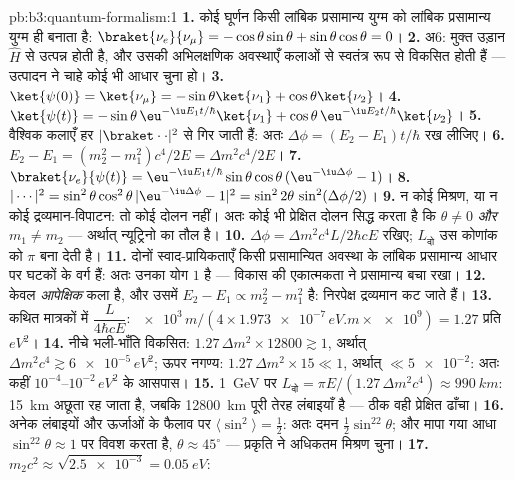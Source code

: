 \begin{solution}{pb:b3:quantum-formalism:1}
\textbf{1.} कोई घूर्णन किसी लांबिक प्रसामान्य युग्म को लांबिक
प्रसामान्य युग्म ही बनाता है: $\braket{\nu_e}{\nu_\mu} = -\cos\theta\sin\theta +
\sin\theta\cos\theta = 0$।
\textbf{2.} अ6: मुक्त उड़ान $\hat H$ से उत्पन्न होती है, और उसकी
अभिलक्षणिक अवस्थाएँ कलाओं से स्वतंत्र रूप से विकसित होती हैं ---
उत्पादन ने चाहे कोई भी आधार चुना हो।
\textbf{3.} $\ket{\psi(0)} = \ket{\nu_\mu} = -\sin\theta\ket{\nu_1}
+ \cos\theta\ket{\nu_2}$।
\textbf{4.} $\ket{\psi(t)} = -\sin\theta\,\eu^{-\iu E_1t/\hbar}
\ket{\nu_1} + \cos\theta\,\eu^{-\iu E_2t/\hbar}\ket{\nu_2}$।
\textbf{5.} वैश्विक कलाएँ हर $|\braket\cdot\cdot|^2$ से गिर जाती हैं:
अतः $\Delta\phi = (E_2 - E_1)t/\hbar$ रख लीजिए।
\textbf{6.} $E_2 - E_1 = (m_2^2 - m_1^2)c^4/2E = \Delta m^2c^4/2E$।
\textbf{7.} $\braket{\nu_e}{\psi(t)} = \eu^{-\iu E_1t/\hbar}
\sin\theta\cos\theta\,(\eu^{-\iu\Delta\phi} - 1)$।
\textbf{8.} $|\cdots|^2 = \sin^2\theta\cos^2\theta\,|{\eu^{-\iu
\Delta\phi} - 1}|^2 = \sin^22\theta\,\sin^2(\Delta\phi/2)$।
\textbf{9.} न कोई मिश्रण, या न कोई द्रव्यमान-विपाटन: तो कोई दोलन
नहीं। अतः कोई भी प्रेक्षित दोलन सिद्ध करता है कि $\theta \neq 0$
\emph{और} $m_1 \neq
m_2$ --- अर्थात् न्यूट्रिनो का तौल है।
\textbf{10.} $\Delta\phi = \Delta m^2c^4L/2\hbar cE$ रखिए;
$L_{\text{दो}}$ उस कोणांक को $\pi$ बना देती है।
\textbf{11.} दोनों स्वाद-प्रायिकताएँ किसी प्रसामान्यित अवस्था के
लांबिक प्रसामान्य आधार पर घटकों के वर्ग हैं: अतः उनका योग $1$ है ---
विकास की एकात्मकता ने प्रसामान्य बचा रखा।
\textbf{12.} केवल \emph{आपेक्षिक} कला  है, और उसमें
$E_2 - E_1 \propto m_2^2 - m_1^2$ है: निरपेक्ष द्रव्यमान कट जाते हैं।
\textbf{13.} कथित मात्रकों में $\dfrac{L}{4\hbar cE}$:
$\num{e3}\,\unit{m}/(4 \times \num{1.973e-7}\,\unit{eV.m} \times
\num{e9}) = 1.27$ प्रति $\unit{eV^2}$।
\textbf{14.} नीचे भली-भाँति विकसित: $1.27\,\Delta m^2 \times 12800
\gtrsim 1$, अर्थात् $\Delta m^2c^4 \gtrsim \num{6e-5}\,\unit{eV^2}$;
ऊपर नगण्य: $1.27\,\Delta m^2 \times 15 \ll 1$, अर्थात् $\ll
\num{5e-2}$: अतः कहीं $10^{-4}$--$10^{-2}\,\unit{eV^2}$ के आसपास।
\textbf{15.} \qty{1}{GeV} पर $L_{\text{दो}} = \pi E/(1.27\,\Delta m^2c^4) \approx
\qty{990}{km}$: \qty{15}{km} अछूता रह जाता है, जबकि
\qty{12800}{km} पूरी तेरह लंबाइयाँ है --- ठीक वही प्रेक्षित ढाँचा।
\textbf{16.} अनेक लंबाइयों और ऊर्जाओं के फैलाव पर
$\langle\sin^2\rangle = \tfrac12$: अतः दमन $\tfrac12\sin^22
\theta$; और मापा गया आधा $\sin^22\theta \approx 1$ पर विवश करता है,
$\theta \approx 45^\circ$ --- प्रकृति ने अधिकतम मिश्रण चुना।
\textbf{17.} $m_2c^2 \approx \sqrt{\num{2.5e-3}} = \qty{0.05}{eV}$:

\end{solution}
